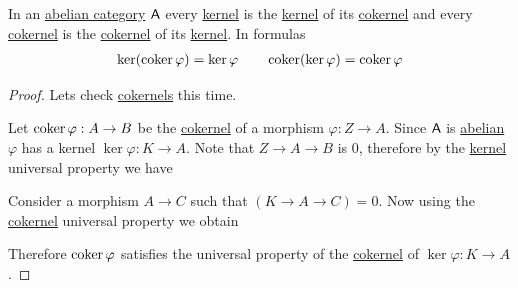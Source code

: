 \documentclass[../../../main]{subfiles}
\begin{document}
\begin{lemma} \label{lemma:kernel-of-cokernel-abelian}
  In an \hyperref[def:abelian-category]{abelian category} \(\mathsf{A}\) every \hyperref[def:categorical-kernel]{kernel} is the \hyperref[def:categorical-kernel]{kernel} of its \hyperref[def:categorical-cokernel]{cokernel} and every \hyperref[def:categorical-cokernel]{cokernel} is the \hyperref[def:categorical-cokernel]{cokernel} of its \hyperref[def:categorical-kernel]{kernel}.
  In formulas
  \begin{align*}
    \ker (\operatorname*{coker} \varphi) = \ker \varphi \qquad \operatorname*{coker} (\ker \varphi) = \operatorname*{coker} \varphi
  \end{align*}
\end{lemma}
\begin{proof}
  Lets check \hyperref[def:categorical-cokernel]{cokernels} this time.

  Let \(\operatorname*{coker} \varphi: A \to B\) be the \hyperref[def:categorical-cokernel]{cokernel} of a morphism \(\varphi: Z \to A\).
  Since \(\mathsf{A}\) is \hyperref[def:abelian-category]{abelian} \(\varphi\) has a kernel \(\ker \varphi: K \to A\).
  Note that \(Z \to A \to B\) is 0, therefore by the \hyperref[def:categorical-kernel]{kernel} universal property we have
  \begin{center}
  \end{center}

  Consider a morphism \(A \to C\) such that \((K \to A \to C) = 0\).
  Now using the \hyperref[def:categorical-cokernel]{cokernel} universal property we obtain
  \begin{center}
  \end{center}
  Therefore \(\operatorname*{coker} \varphi\) satisfies the universal property of the \hyperref[def:categorical-cokernel]{cokernel} of \(\ker \varphi: K \to A\).
\end{proof}
\end{document}
